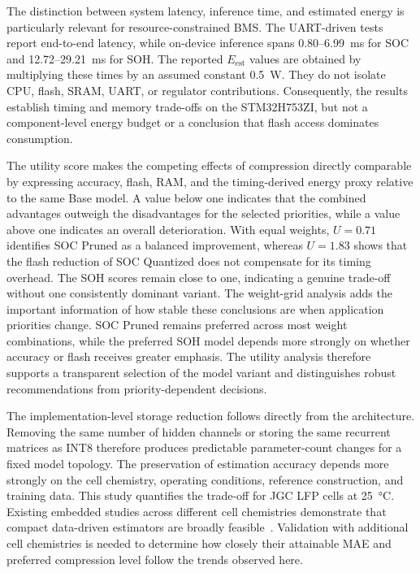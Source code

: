 \documentclass[review]{elsarticle}
\begin{document}
The distinction between system latency, inference time, and estimated energy is particularly relevant for resource-constrained BMS. The UART-driven tests report end-to-end latency, while on-device inference spans 0.80--6.99~ms for SOC and 12.72--29.21~ms for SOH. The reported $E_{\mathrm{est}}$ values are obtained by multiplying these times by an assumed constant \SI{0.5}{\watt}. They do not isolate CPU, flash, SRAM, UART, or regulator contributions. Consequently, the results establish timing and memory trade-offs on the STM32H753ZI, but not a component-level energy budget or a conclusion that flash access dominates consumption.

The utility score makes the competing effects of compression directly comparable by expressing accuracy, flash, RAM, and the timing-derived energy proxy relative to the same Base model. A value below one indicates that the combined advantages outweigh the disadvantages for the selected priorities, while a value above one indicates an overall deterioration. With equal weights, $U=0.71$ identifies SOC Pruned as a balanced improvement, whereas $U=1.83$ shows that the flash reduction of SOC Quantized does not compensate for its timing overhead. The SOH scores remain close to one, indicating a genuine trade-off without one consistently dominant variant. The weight-grid analysis adds the important information of how stable these conclusions are when application priorities change. SOC Pruned remains preferred across most weight combinations, while the preferred SOH model depends more strongly on whether accuracy or flash receives greater emphasis. The utility analysis therefore supports a transparent selection of the model variant and distinguishes robust recommendations from priority-dependent decisions.

The implementation-level storage reduction follows directly from the architecture. Removing the same number of hidden channels or storing the same recurrent matrices as INT8 therefore produces predictable parameter-count changes for a fixed model topology. The preservation of estimation accuracy depends more strongly on the cell chemistry, operating conditions, reference construction, and training data. This study quantifies the trade-off for JGC LFP cells at \SI{25}{\degreeCelsius}. Existing embedded studies across different cell chemistries demonstrate that compact data-driven estimators are broadly feasible~\cite{giazitzisCaseStudyTiny2024,liOnlineCapacityEstimation2021,rzepkaNeuralNetworkArchitecture2023a}. Validation with additional cell chemistries is needed to determine how closely their attainable MAE and preferred compression level follow the trends observed here.
\end{document}
